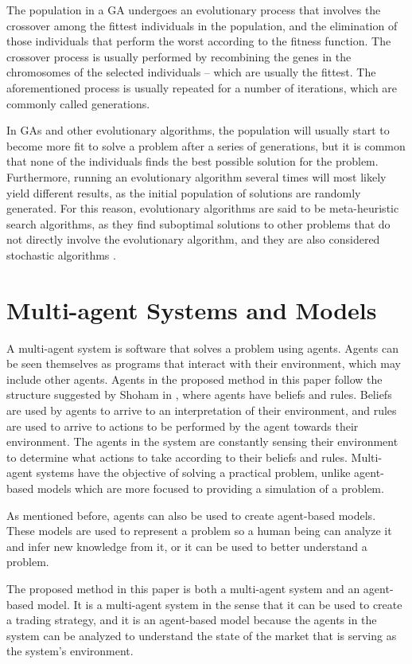 The population in a GA undergoes an evolutionary process that involves the
crossover among the fittest individuals in the population, and the elimination
of those individuals that perform the worst according to the fitness
function. The crossover process is usually performed by recombining the genes in
the chromosomes of the selected individuals -- which are usually the
fittest. The aforementioned process is usually repeated for a number of
iterations, which are commonly called generations.

In GAs and other evolutionary algorithms, the population will usually start to
become more fit to solve a problem after a series of generations, but it is
common that none of the individuals finds the best possible solution for the
problem. Furthermore, running an evolutionary algorithm several times will most
likely yield different results, as the initial population of solutions are
randomly generated. For this reason, evolutionary algorithms are said to be
meta-heuristic search algorithms, as they find suboptimal solutions to other
problems that do not directly involve the evolutionary algorithm, and they are
also considered stochastic algorithms \cite{Harik1999}.

\section{Multi-agent Systems and Models}
\label{section:multi-agent-systems-and-models}

A multi-agent system is software that solves a problem using agents. Agents can
be seen themselves as programs that interact with their environment, which may
include other agents. Agents in the proposed method in this paper follow the
structure suggested by Shoham in \cite{Shoham1993}, where agents have beliefs
and rules. Beliefs are used by agents to arrive to an interpretation of their
environment, and rules are used to arrive to actions to be performed by the
agent towards their environment. The agents in the system are constantly sensing
their environment to determine what actions to take according to their beliefs
and rules. Multi-agent systems have the objective of solving a practical
problem, unlike agent-based models which are more focused to providing a
simulation of a problem.

As mentioned before, agents can also be used to create agent-based models. These
models are used to represent a problem so a human being can analyze it and infer
new knowledge from it, or it can be used to better understand a problem.

The proposed method in this paper is both a multi-agent system and an
agent-based model. It is a multi-agent system in the sense that it can be used
to create a trading strategy, and it is an agent-based model because the agents
in the system can be analyzed to understand the state of the market that is
serving as the system's environment.
